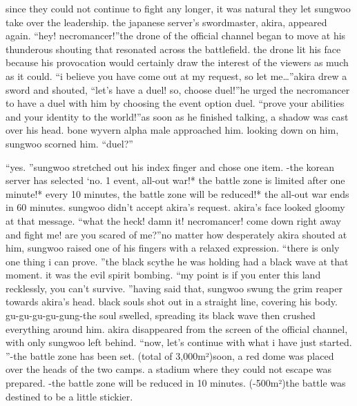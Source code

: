  since they could not continue to fight any longer, it was natural they let sungwoo take over the leadership.
the japanese server’s swordmaster, akira, appeared again.
“hey! necromancer!”the drone of the official channel began to move at his thunderous shouting that resonated across the battlefield.
 the drone lit his face because his provocation would certainly draw the interest of the viewers as much as it could.
“i believe you have come out at my request, so let me…”akira drew a sword and shouted, “let’s have a duel! so, choose duel!”he urged the necromancer to have a duel with him by choosing the event option duel.
“prove your abilities and your identity to the world!”as soon as he finished talking, a shadow was cast over his head.
 bone wyvern alpha male approached him.
 looking down on him, sungwoo scorned him.
“duel?”

“yes.
”sungwoo stretched out his index finger and chose one item.
-the korean server has selected ‘no.
 1 event, all-out war!* the battle zone is limited after one minute!* every 10 minutes, the battle zone will be reduced!* the all-out war ends in 60 minutes.
sungwoo didn’t accept akira’s request.
akira’s face looked gloomy at that message.
“what the heck! damn it! necromancer! come down right away and fight me! are you scared of me?”no matter how desperately akira shouted at him, sungwoo raised one of his fingers with a relaxed expression.
“there is only one thing i can prove.
”the black scythe he was holding had a black wave at that moment.
 it was the evil spirit bombing.
“my point is if you enter this land recklessly, you can’t survive.
”having said that, sungwoo swung the grim reaper towards akira’s head.
 black souls shot out in a straight line, covering his body.
gu-gu-gu-gu-gung-the soul swelled, spreading its black wave then crushed everything around him.
akira disappeared from the screen of the official channel, with only sungwoo left behind.
“now, let’s continue with what i have just started.
”-the battle zone has been set.
 (total of 3,000m²)soon, a red dome was placed over the heads of the two camps.
a stadium where they could not escape was prepared.
-the battle zone will be reduced in 10 minutes.
 (-500m²)the battle was destined to be a little stickier.


 